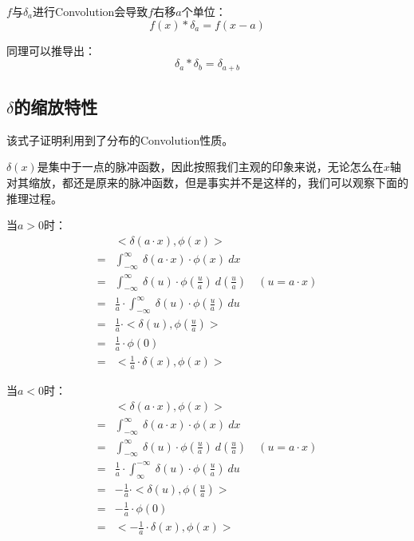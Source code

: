 $f$与$\delta_a$进行Convolution会导致$f$右移$a$个单位：
\begin{equation}
	f(x)*\delta_a=f(x-a)
\end{equation}

同理可以推导出：
\begin{equation}
	\delta_a*\delta_b=\delta_{a+b}
\end{equation}
\subsection{$\delta$的缩放特性}
该式子证明利用到了分布的Convolution性质。

$\delta(x)$是集中于一点的脉冲函数，因此按照我们主观的印象来说，无论怎么在$x$轴对其缩放，都还是原来的脉冲函数，但是事实并不是这样的，我们可以观察下面的推理过程。

当$a>0$时：
\begin{align*}
	  & <\delta(a\cdot x),\phi(x)>                                                                  \\
	= & \int_{-\infty}^{\infty}\ \delta(a\cdot x)\cdot \phi(x)\ dx                                  \\
	= & \int_{-\infty}^{\infty}\ \delta(u)\cdot \phi(\frac{u}{a})\ d(\frac{u}{a})\quad (u=a\cdot x) \\
	= & \frac{1}{a}\cdot \int_{-\infty}^{\infty}\ \delta(u)\cdot \phi(\frac{u}{a})\ du              \\
	= & \frac{1}{a}\cdot<\delta(u),\phi(\frac{u}{a})>                                               \\
	= & \frac{1}{a}\cdot \phi(0)                                                                    \\
	= & <\frac{1}{a}\cdot \delta(x),\phi(x)>
\end{align*}

当$a<0$时：
\begin{align*}
	  & <\delta(a\cdot x),\phi(x)>                                                                  \\
	= & \int_{-\infty}^{\infty}\ \delta(a\cdot x)\cdot \phi(x)\ dx                                  \\
	= & \int_{-\infty}^{\infty}\ \delta(u)\cdot \phi(\frac{u}{a})\ d(\frac{u}{a})\quad (u=a\cdot x) \\
	= & \frac{1}{a}\cdot \int_{\infty}^{-\infty}\ \delta(u)\cdot \phi(\frac{u}{a})\ du              \\
	= & -\frac{1}{a}\cdot<\delta(u),\phi(\frac{u}{a})>                                              \\
	= & -\frac{1}{a}\cdot \phi(0)                                                                   \\
	= & <-\frac{1}{a}\cdot \delta(x),\phi(x)>
\end{align*}

